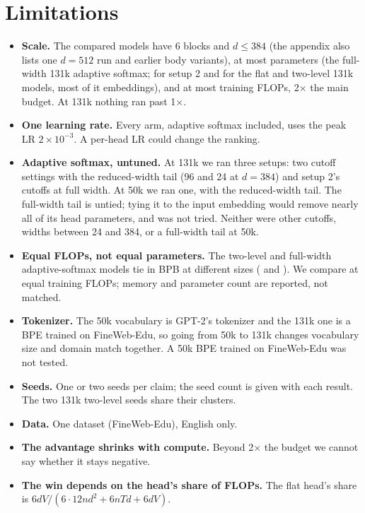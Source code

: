 \documentclass[11pt]{article}
\theoremstyle{remark}
\begin{document}
\section{Limitations}\label{sec:limits}
\begin{itemize}
  \item \textbf{Scale.} The compared models have 6 blocks and $d \le 384$ (the appendix also lists one $d=512$ run and
  earlier body variants), at most \ParamsAsBigW{} parameters (the full-width 131k adaptive softmax; \ParamsAsBigTwo{} for
  setup 2 and \ParamsBigVMax{} for the flat and two-level 131k models, most of it embeddings), and at most \GapFlopsTwo{}
  training FLOPs, 2$\times$ the main budget. At 131k nothing ran past 1$\times$.
  \item \textbf{One learning rate.} Every arm, adaptive softmax included, uses the peak LR $2\times10^{-3}$. A per-head LR could
  change the ranking.
  \item \textbf{Adaptive softmax, untuned.} At 131k we ran three setups: two cutoff settings with the reduced-width tail (96 and
  24 at $d=384$) and setup 2's cutoffs at full width. At 50k we ran one, with the reduced-width tail. The full-width tail is untied;
  tying it to the input embedding would remove nearly all of its \HeadParamsAsBigW{} head parameters, and was not tried. Neither were
  other cutoffs, widths between 24 and 384, or a full-width tail at 50k.
  \item \textbf{Equal FLOPs, not equal parameters.} The two-level and full-width adaptive-softmax models tie in BPB at different
  sizes (\ParamsTlBig{} and \ParamsAsBigW{}). We compare at equal training FLOPs; memory and parameter count are reported, not
  matched.
  \item \textbf{Tokenizer.} The 50k vocabulary is GPT-2's tokenizer and the 131k one is a BPE trained on FineWeb-Edu, so going
  from 50k to 131k changes vocabulary size and domain match together. A 50k BPE trained on FineWeb-Edu was not tested.
  \item \textbf{Seeds.} One or two seeds per claim; the seed count is given with each result. The two 131k two-level seeds share
  their clusters.
  \item \textbf{Data.} One dataset (FineWeb-Edu), English only.
  \item \textbf{The advantage shrinks with compute.} Beyond 2$\times$ the budget we cannot say whether it stays negative.
  \item \textbf{The win depends on the head's share of FLOPs.} The flat head's share is $6dV / (6 \cdot 12nd^2 + 6nTd + 6dV)$.

\end{itemize}
\end{document}
